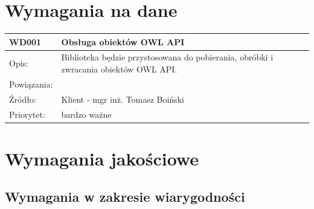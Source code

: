\documentclass[a4paper,10pt]{article}
\begin{document}
\section{Wymagania na dane}


\begin{center}
 
\begin{tabular}{|m{3cm}|m{9cm}|} \hline

WD001 & Obsługa obiektów OWL API \\ \hline
Opis: & Biblioteka będzie przystosowana do pobierania, obróbki i zwracania obiektów OWL API. \\ \hline
Powiązania: &  \\ \hline
Źródło: & Klient - mgr inż. Tomasz Boiński  \\ \hline
Priorytet: &  bardzo ważne \\ \hline

\end{tabular}

\end{center}

\section{Wymagania jakościowe}


\subsection{Wymagania w zakresie wiarygodności}

\end{document}
